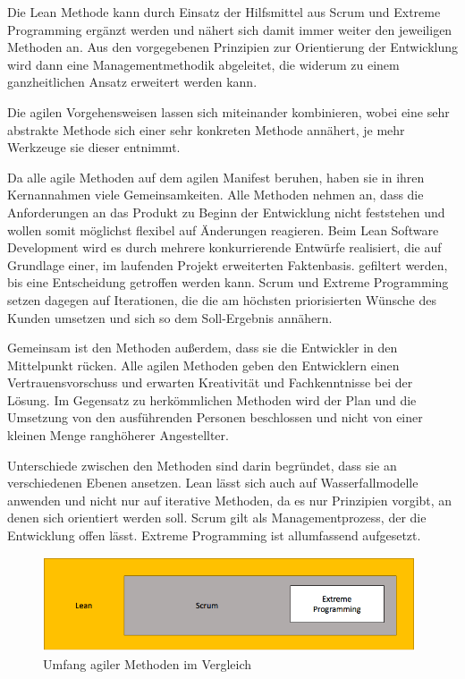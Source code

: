         Die Lean Methode kann durch Einsatz der Hilfsmittel aus Scrum und Extreme Programming ergänzt werden und nähert sich damit immer weiter den jeweiligen Methoden an. Aus den vorgegebenen Prinzipien zur Orientierung der Entwicklung wird dann eine Managementmethodik abgeleitet, die widerum zu einem ganzheitlichen Ansatz erweitert werden kann.

        Die agilen Vorgehensweisen lassen sich miteinander kombinieren, wobei eine sehr abstrakte Methode sich einer sehr konkreten Methode annähert, je mehr Werkzeuge sie dieser entnimmt.

        Da alle agile Methoden auf dem agilen Manifest beruhen, haben sie in ihren Kernannahmen viele Gemeinsamkeiten. Alle Methoden nehmen an, dass die Anforderungen an das Produkt zu Beginn der Entwicklung nicht feststehen und wollen somit möglichst flexibel auf Änderungen reagieren. Beim Lean Software Development wird es durch mehrere konkurrierende Entwürfe realisiert, die auf Grundlage einer, im laufenden Projekt erweiterten Faktenbasis. gefiltert werden, bis eine Entscheidung getroffen werden kann. Scrum und Extreme Programming setzen dagegen auf Iterationen, die die am höchsten priorisierten Wünsche des Kunden umsetzen und sich so dem Soll-Ergebnis annähern.

        Gemeinsam ist den Methoden außerdem, dass sie die Entwickler in den Mittelpunkt rücken. Alle agilen Methoden geben den Entwicklern einen Vertrauensvorschuss und erwarten Kreativität und Fachkenntnisse bei der Lösung. Im Gegensatz zu herkömmlichen Methoden wird der Plan und die Umsetzung von den ausführenden Personen beschlossen und nicht von einer kleinen Menge ranghöherer Angestellter.

        Unterschiede zwischen den Methoden sind darin begründet, dass sie an verschiedenen Ebenen ansetzen. Lean lässt sich auch auf Wasserfallmodelle anwenden und nicht nur auf iterative Methoden, da es nur Prinzipien vorgibt, an denen sich orientiert werden soll. Scrum gilt als Managementprozess, der die Entwicklung offen lässt. Extreme Programming ist allumfassend aufgesetzt.

        \begin{figure}[!htbp]
            \begin{center}
                \includegraphics[width=11cm]{Abbildungen/ag_methoden}
                \caption[Umfang agiler Methoden im Vergleich]{Umfang agiler Methoden im Vergleich}
                \label{abb:vergleich}
            \end{center}
        \end{figure}

